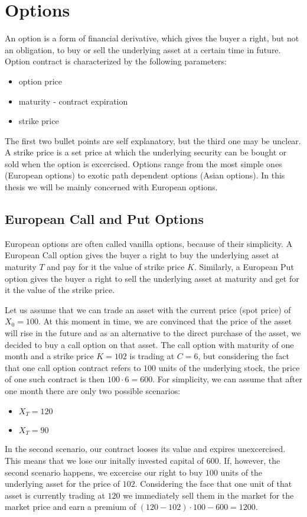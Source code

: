 \documentclass[times, utf8, diplomski]{fer}
\begin{document}
\section{Options}
An option is a form of financial derivative, which gives the buyer a right, but not an obligation, to buy or sell the underlying asset at a certain time in future. Option contract is characterized by the following parameters:
\begin{itemize}
	\item option price
	\item maturity - contract expiration
	\item strike price
\end{itemize} The first two bullet points are self explanatory, but the third one may be unclear. A strike price is a set price at which the underlying security can be bought or sold when the option is excercised. Options range from the most simple ones (European options) to exotic path dependent options (Asian options). In this thesis we will be mainly concerned with European options.

\subsection{European Call and Put Options}
European options are often called vanilla options, because of their simplicity. A European Call option gives the buyer a right to buy the underlying asset at maturity $T$ and pay for it the value of strike price $K$. Similarly, a European Put option gives the buyer a right to sell the underlying asset at maturity and get for it the value of the strike price. 

\hfill \break
\indent Let us assume that we can trade an asset with the current price (spot price) of $X_0 = 100$. At this moment in time, we are convinced that the price of the asset will rise in the future and as an alternative to the direct purchase of the asset, we decided to buy a call option on that asset. The call option with maturity of one month and a strike price $K=102$ is trading at $C=6$, but considering the fact that one call option contract refers to $100$ units of the underlying stock, the price of one such contract is then $100 \cdot 6 = 600$. For simplicity, we can assume that after one month there are only two possible scenarios:
\begin{itemize}
	\item $X_T = 120$
	\item $X_T = 90$
\end{itemize} In the second scenario, our contract looses its value and expires unexcercised. This means that we lose our initally invested capital of $600$. If, however, the second scenario happens, we excercise our right to buy $100$ units of the underlying asset for the price of $102$. Considering the face that one unit of that asset is currently trading at $120$ we immediately sell them in the market for the market price and earn a premium of $(120 - 102)\cdot 100 - 600 = 1200$.
\end{document}
